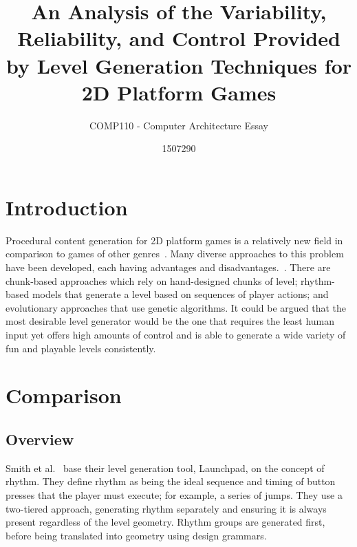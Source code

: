 \documentclass{scrartcl}
\title{An Analysis of the Variability, Reliability, and Control Provided by Level Generation Techniques for 2D Platform Games}
\subtitle{COMP110 - Computer Architecture Essay}
\author{1507290}
\begin{document}
\maketitle


\section{Introduction}
Procedural content generation for 2D platform games is a relatively new field in comparison to games of other genres~\cite{compton:platform}. Many diverse approaches to this problem have been developed, each having advantages and disadvantages.~\cite{horn:comparative}. There are chunk-based approaches which rely on hand-designed chunks of level; rhythm-based models that generate a level based on sequences of player actions; and evolutionary approaches that use genetic algorithms. It could be argued that the most desirable level generator would be the one that requires the least human input yet offers high amounts of control and is able to generate a wide variety of fun and playable levels consistently. 

\section{Comparison}

\subsection{Overview}
Smith et al.~\cite{smith:launchpad} base their level generation tool, Launchpad, on the concept of rhythm. They define rhythm as being the ideal sequence and timing of button presses that the player must execute; for example, a series of jumps. They use a two-tiered approach, generating rhythm separately and ensuring it is always present regardless of the level geometry. Rhythm groups are generated first, before being translated into geometry using design grammars. 
\end{document}

